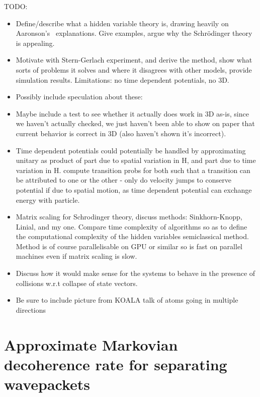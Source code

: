 TODO:
\begin{itemize}
\item Define/describe what a hidden variable theory is, drawing heavily on Aaronson's~\cite{Aaronson2005} explanations. Give examples, argue why the Schr\"odinger theory is appealing.

\item Motivate with Stern-Gerlach experiment, and derive the method, show what sorts of problems it
solves and where it disagrees with other models, provide simulation results. Limitations: no time dependent potentials, no 3D.

\item Possibly include speculation about these:

\item Maybe include a test to see whether it actually does work in 3D as-is, since we haven't actually checked, we just haven't been able to show on paper that current behavior is correct in 3D (also haven't shown it's incorrect).

\item Time dependent potentials could potentially be handled by approximating unitary as product of part due to spatial variation in H, and part due to time variation in H. compute transition probs for both such that a transition can be attributed to one or the other - only do velocity jumps to conserve potential if due to spatial motion, as time dependent potential can exchange energy with particle.

\item Matrix scaling for Schrodinger theory, discuss methods: Sinkhorn-Knopp, Linial, and my one. Compare time complexity of algorithms so as to define the computational complexity of the hidden variables semiclassical method. Method is of course parallelisable on GPU or similar so is fast on parallel machines even if matrix scaling is slow.

\item Discuss how it would make sense for the systems to behave in the presence of collisions w.r.t collapse of state vectors.

\item Be sure to include picture from KOALA talk of atoms going in multiple directions
\end{itemize}

\section{Approximate Markovian decoherence rate for separating wavepackets}


